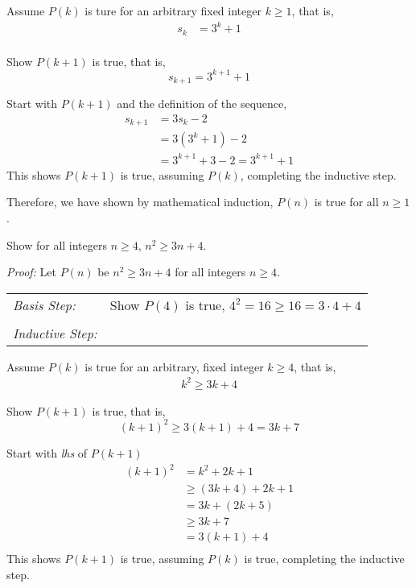 \begin{questions}
\begin{solution}
  Assume $P(k)$ is ture for an arbitrary fixed integer $k \geq 1$, that is, 
  \begin{align*}
    s_k &= 3^k + 1 \tag{IH} \\
  \end{align*}

  Show $P(k+1)$ is true, that is,
  \[ s_{k+1} = 3^{k+1} + 1 \]

  Start with $P(k+1)$ and the definition of the sequence, 
  \begin{align*}
    s_{k+1} &= 3s_{k} - 2 \\
    &= 3(3^k + 1) - 2 \tag{IH}\\
    &= 3^{k+1} + 3 - 2 = 3^{k+1} + 1
  \end{align*}
  This shows $P(k+1)$ is true, assuming $P(k)$, completing the inductive step.

  \smallskip
  Therefore, we have shown by mathematical induction, $P(n)$ is true for all $n \geq 1$.
\end{solution}




 Show for all integers $n \geq 4$, $n^2 \geq 3n + 4$. 
    \ifprintanswers
        \vspace{-10pt}
   \fi
\begin{solution}
  \textit{Proof:}
  Let $P(n)$ be $n^2 \geq 3n + 4$ for all integers $n \geq 4$.

  \smallskip
  \begin{tabular}{lp{4in}}
    \textit{Basis Step:} & Show $P(4)$ is true, $4^2 = 16 \geq 16 = 3\cdot 4 + 4$ \\
     & \\
   \textit{Inductive Step:} &  \\
  \end{tabular}

  Assume $P(k)$ is true for an arbitrary, fixed integer $k \geq 4$, that is, 
  \begin{align*}
    k^2 \geq 3k + 4 \tag{IH} 
  \end{align*}

  Show $P(k+1)$ is true, that is, 
  \[ (k+1)^2 \geq 3(k+1) + 4 = 3k + 7 \]

  Start with \textit{lhs} of $P(k+1)$
  \begin{align*}
    (k+1)^2 &= k^2 + 2k + 1 \\
     &\geq (3k + 4) + 2k + 1 \tag{IH} \\
     &= 3k + (2k + 5) \\
     &\geq 3k + 7 \tag{2k +5 $\geq 7$ or k $\geq$ 1, for all k $\geq$ 4} \\
     &= 3(k+1) + 4 \\
  \end{align*}
  This shows $P(k+1)$ is true, assuming $P(k)$ is true, completing the inductive step. 


\end{solution}
\end{questions}
